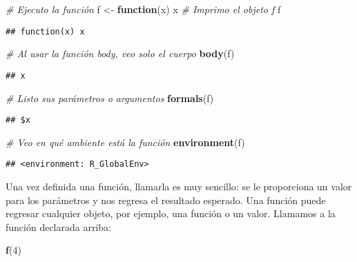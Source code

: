 \documentclass[]{article}
\newenvironment{Shaded}{\begin{snugshade}}{\end{snugshade}}
\newcommand{\KeywordTok}[1]{\textcolor[rgb]{0.13,0.29,0.53}{\textbf{#1}}}
\newcommand{\DecValTok}[1]{\textcolor[rgb]{0.00,0.00,0.81}{#1}}
\newcommand{\StringTok}[1]{\textcolor[rgb]{0.31,0.60,0.02}{#1}}
\newcommand{\CommentTok}[1]{\textcolor[rgb]{0.56,0.35,0.01}{\textit{#1}}}
\newcommand{\ControlFlowTok}[1]{\textcolor[rgb]{0.13,0.29,0.53}{\textbf{#1}}}
\newcommand{\NormalTok}[1]{#1}
\begin{document}
\begin{Shaded}
\begin{Highlighting}[]
\CommentTok{# Ejecuto la función}
\NormalTok{f <-}\StringTok{ }\ControlFlowTok{function}\NormalTok{(x) x}
\CommentTok{# Imprimo el objeto f}
\NormalTok{f}
\end{Highlighting}
\end{Shaded}

\begin{verbatim}
## function(x) x
\end{verbatim}

\begin{Shaded}
\begin{Highlighting}[]
\CommentTok{# Al usar la función body, veo solo el cuerpo}
\KeywordTok{body}\NormalTok{(f)}
\end{Highlighting}
\end{Shaded}

\begin{verbatim}
## x
\end{verbatim}

\begin{Shaded}
\begin{Highlighting}[]
\CommentTok{# Listo sus parámetros o argumentos}
\KeywordTok{formals}\NormalTok{(f)}
\end{Highlighting}
\end{Shaded}

\begin{verbatim}
## $x
\end{verbatim}

\begin{Shaded}
\begin{Highlighting}[]
\CommentTok{# Veo en qué ambiente está la función}
\KeywordTok{environment}\NormalTok{(f)}
\end{Highlighting}
\end{Shaded}

\begin{verbatim}
## <environment: R_GlobalEnv>
\end{verbatim}

Una vez definida una función, llamarla es muy sencillo: se le
proporciona un valor para los parámetros y nos regresa el resultado
esperado. Una función puede regresar cualquier objeto, por ejemplo, una
función o un valor. Llamamos a la función declarada arriba:

\begin{Shaded}
\begin{Highlighting}[]
\KeywordTok{f}\NormalTok{(}\DecValTok{4}\NormalTok{)}
\end{Highlighting}
\end{Shaded}
\end{document}
